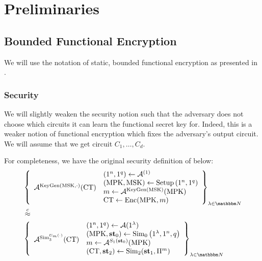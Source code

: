 \newcommand{\MPK}{\text{MPK}}
\newcommand{\MSK}{\text{MSK}}
\newcommand{\SK}{\text{SK}}
\newcommand{\Enc}{\texttt{Enc}}
\newcommand{\Dec}{\texttt{Dec}}
\newcommand{\FEEnc}{\text{FE.Enc}}
\newcommand{\FEDec}{\text{FE.Dec}}
\newcommand{\FESetup}{\text{FE.Setup}}
\newcommand{\FEKeygen}{\text{FE.Keygen}}
\newcommand{\FECT}{\text{CT}}
\newcommand{\adversD}{\mathcal{D}}


\section{Preliminaries}
\subsection{Bounded Functional Encryption}
We will use the notation of static, bounded functional encryption as presented in
\cite{garg2022dynamic}.

\subsubsection*{Security}
We will slightly weaken the security notion such that the adversary does not choose
which circuits it can learn the functional secret key for. Indeed, this is a weaker notion of functional encryption
which fixes the adversary's output circuit.
We will assume that we get circuit $C_1, \dots, C_d$.

For completeness, we have the original security definition of \cite{garg2022dynamic} below:
\[
\begin{aligned}
&\left\{
\begin{array}{l}
\vcenter{\hbox{$\advers^{\text{KeyGen}(\MSK, \cdot)}(\mathbf{\FECT})$}}
\end{array}
\begin{array}{l}
\left(1^n, 1^q\right) \leftarrow \advers^{(1)} \\
\left(\MPK, \MSK\right) \leftarrow \text{Setup}\left(1^n, 1^q\right) \\
m \leftarrow \advers^{\text{KeyGen}(\MSK)}(\MPK) \\
\FECT \leftarrow \text{Enc}(\MPK, m)
\end{array}
\right\}_{\lambda \in \N}\\
&\compInd \\
&\left\{
\begin{array}{l}
\vcenter{\hbox{$\advers^{\Sim_3^{U_m(\cdot)}}(\FECT)$}}
\end{array}
\begin{array}{l}
\left(1^n, 1^q\right) \leftarrow \advers{(1^\lambda)} \\
\left(\MPK, \mathbf{st}_0\right) \leftarrow \Sim_0\left(1^\lambda, 1^n, q\right) \\
m \leftarrow \advers^{S_1(\mathbf{st}_0)}(\MPK) \\
\left(\FECT, \mathbf{st}_2\right) \leftarrow \Sim_2(\mathbf{st}_1, \Pi^m)
\end{array}
\right\}_{\lambda \in \N}
\end{aligned}
\]

